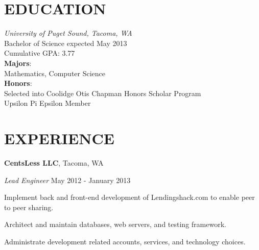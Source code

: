 \documentclass[line,margin]{res}
\newenvironment{itemize*}%
  {\begin{itemize}%
    \setlength{\parsep}{0pt}
    \setlength{\itemsep}{0pt}%
    \setlength{\parskip}{0pt}}%
  {\end{itemize}}
\begin{document}
\address{2214 N. Washington Street, Tacoma, WA 98406}
\address{kwenholz@pugetsound.edu\hspace*{2mm} \vline \hspace*{2mm} (406)546-9210}


\begin{resume}
\vspace*{.3cm}

\section{EDUCATION} {\sl University of Puget Sound, Tacoma, WA} \\
                Bachelor of Science
                expected May 2013 \\
                Cumulative GPA: 3.77\\
                \textbf{Majors}: \\
\hspace*{5mm}                Mathematics, Computer Science \\
                \textbf{Honors}:\\
\hspace*{5mm}   Selected into Coolidge Otis Chapman Honors Scholar Program\\
\hspace*{5mm}   Upsilon Pi Epsilon Member\\

\vspace*{.2cm}

\section{EXPERIENCE}

\textbf{CentsLess LLC}, Tacoma, WA

{\sl Lead Engineer} \hfill May 2012 - January 2013
\begin{itemize*}
    \item Implement back and front-end development of Lendingshack.com
        to enable peer to peer sharing.
    \item Architect and maintain databases, web servers, and testing framework.
    \item Administrate development related accounts, services, and technology
        choices.
\end{itemize*}


\end{resume}
\end{document}

